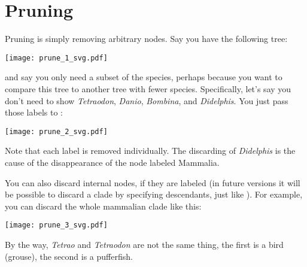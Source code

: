 \section{Pruning}
\label{sct_prune}

Pruning is simply removing arbitrary nodes. Say you have the following tree:

\begin{center}
\texttt{[image: prune\_1\_svg.pdf]}
\end{center}

\noindent{}and say you only need a subset of the species, perhaps because you
want to compare this tree to another tree with fewer species. Specifically,
let's say you don't need to show \textit{Tetraodon}, \textit{Danio},
\textit{Bombina}, and \textit{Didelphis}. You just pass those labels to
\prune:


\begin{center}
\texttt{[image: prune\_2\_svg.pdf]}
\end{center}

\noindent{}Note that each label is removed individually. The discarding of
\textit{Didelphis} is the cause of the disappearance of the node labeled
Mammalia.

You can also discard internal nodes, if they are labeled (in future versions
it will be possible to discard a clade by specifying descendants, just like
\clade). For example, you can discard the whole mammalian clade like this:


\begin{center}
\texttt{[image: prune\_3\_svg.pdf]} 
\end{center}

By the way, \textit{Tetrao} and \textit{Tetraodon} are not the same thing, the
first is a bird (grouse), the second is a pufferfish.
